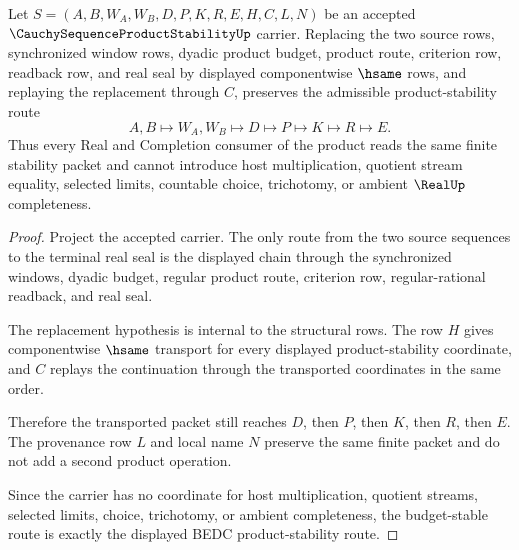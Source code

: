 \begin{theorem}
\label{thm:cauchy-sequence-product-stability-budget-stability}
Let $S=(A,B,W_A,W_B,D,P,K,R,E,H,C,L,N)$ be an accepted $\CauchySequenceProductStabilityUp$ carrier. Replacing the two source rows, synchronized window rows, dyadic product budget, product route, criterion row, readback row, and real seal by displayed componentwise $\hsame$ rows, and replaying the replacement through $C$, preserves the admissible product-stability route
$$
A,B\longmapsto W_A,W_B\longmapsto D\longmapsto P\longmapsto K\longmapsto R\longmapsto E .
$$
Thus every Real and Completion consumer of the product reads the same finite stability packet and cannot introduce host multiplication, quotient stream equality, selected limits, countable choice, trichotomy, or ambient $\RealUp$ completeness.
\end{theorem}
\begin{proof}
Project the accepted carrier. The only route from the two source sequences to the terminal real seal is the displayed chain through the synchronized windows, dyadic budget, regular product route, criterion row, regular-rational readback, and real seal.

The replacement hypothesis is internal to the structural rows. The row $H$ gives componentwise $\hsame$ transport for every displayed product-stability coordinate, and $C$ replays the continuation through the transported coordinates in the same order.

Therefore the transported packet still reaches $D$, then $P$, then $K$, then $R$, then $E$. The provenance row $L$ and local name $N$ preserve the same finite packet and do not add a second product operation.

Since the carrier has no coordinate for host multiplication, quotient streams, selected limits, choice, trichotomy, or ambient completeness, the budget-stable route is exactly the displayed BEDC product-stability route.
\end{proof}


